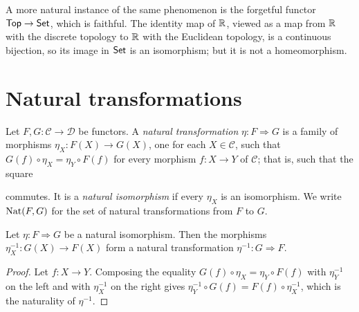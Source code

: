 \begin{remark}\label{categories:remark-forgetful-top}
A more natural instance of the same phenomenon is the forgetful functor
$\mathsf{Top} \to \mathsf{Set}$, which is faithful. The identity map of $\mathbb{R}$, viewed as a
map from $\mathbb{R}$ with the discrete topology to $\mathbb{R}$ with the Euclidean topology,
is a continuous bijection, so its image in $\mathsf{Set}$ is an isomorphism; but it
is not a homeomorphism.
\end{remark}

\section{Natural transformations}\label{categories:section-natural-transformations}

\begin{definition}\label{categories:definition-natural-transformation}
Let $F, G \colon \mathcal{C} \to \mathcal{D}$ be functors. A
\emph{natural transformation} $\eta \colon F \Rightarrow G$ is a family of
morphisms $\eta_X \colon F(X) \to G(X)$, one for each $X \in \mathcal{C}$, such
that $G(f) \circ \eta_X = \eta_Y \circ F(f)$ for every morphism
$f \colon X \to Y$ of $\mathcal{C}$; that is, such that the square
\begin{center}
\end{center}
commutes. It is a \emph{natural isomorphism} if every $\eta_X$ is an
isomorphism. We write $\operatorname{Nat}(F, G)$ for the set of natural transformations
from $F$ to $G$.
\end{definition}

\begin{lemma}\label{categories:lemma-natural-inverse}
Let $\eta \colon F \Rightarrow G$ be a natural isomorphism. Then the morphisms
$\eta_X^{-1} \colon G(X) \to F(X)$ form a natural transformation
$\eta^{-1} \colon G \Rightarrow F$.
\end{lemma}

\begin{proof}
Let $f \colon X \to Y$. Composing the equality
$G(f) \circ \eta_X = \eta_Y \circ F(f)$ with $\eta_Y^{-1}$ on the left and with
$\eta_X^{-1}$ on the right gives
$\eta_Y^{-1} \circ G(f) = F(f) \circ \eta_X^{-1}$, which is the naturality of
$\eta^{-1}$.
\end{proof}

